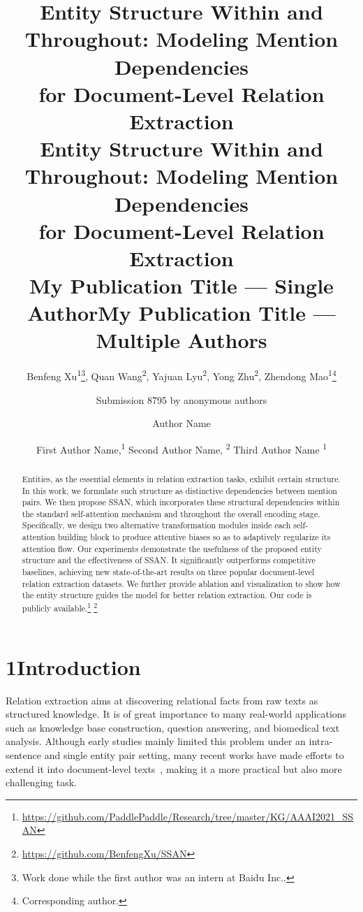 \documentclass[letterpaper]{article} \usepackage{aaai21}  \usepackage{times}  \usepackage{helvet} \usepackage{courier}  \usepackage[hyphens]{url}  \usepackage{graphicx} \usepackage{booktabs}
\title{Entity Structure Within and Throughout: Modeling Mention Dependencies\\
 for Document-Level Relation Extraction\\}
\author {
Benfeng Xu\textsuperscript{\rm 1}\thanks{Work done while the first author was an intern at Baidu Inc..},
        Quan Wang\textsuperscript{\rm 2},
        Yajuan Lyu\textsuperscript{\rm 2},
        Yong Zhu\textsuperscript{\rm 2},
        Zhendong Mao\textsuperscript{\rm 1}\thanks{Corresponding author.} \\
}
\title{Entity Structure Within and Throughout: Modeling Mention Dependencies\\
 for Document-Level Relation Extraction\\
}
\author{
Submission 8795 by anonymous authors
    }
\title{My Publication Title --- Single Author}
\author {
Author Name \\
}
\title{My Publication Title --- Multiple Authors}
\author {


        First Author Name,\textsuperscript{\rm 1}
        Second Author Name, \textsuperscript{\rm 2}
        Third Author Name \textsuperscript{\rm 1} \\
}
\begin{document}
\maketitle

\begin{abstract}
Entities, as the essential elements in relation extraction tasks, exhibit certain structure.
In this work, we formulate such structure as distinctive dependencies between mention pairs.
We then propose SSAN, which incorporates these structural dependencies within the standard self-attention mechanism and throughout the overall encoding stage.
Specifically, we design two alternative transformation modules inside each self-attention building block to produce attentive biases so as to adaptively regularize its attention flow.
Our experiments demonstrate the usefulness of the proposed entity structure and the effectiveness of SSAN.
It significantly outperforms competitive baselines, achieving new state-of-the-art results on three popular document-level relation extraction datasets.
We further provide ablation and visualization to show how the entity structure guides the model for better relation extraction. Our code is publicly available.\footnote{\url{https://github.com/PaddlePaddle/Research/tree/master/KG/AAAI2021_SSAN}}
\footnote{\url{https://github.com/BenfengXu/SSAN}}
\end{abstract}


\section{1\quad Introduction}
Relation extraction aims at discovering relational facts from raw texts as structured knowledge.
It is of great importance to many real-world applications such as knowledge base construction, question answering, and biomedical text analysis.
Although early studies mainly limited this problem under an intra-sentence and single entity pair setting, many recent works have made efforts to extend it into document-level texts~\cite{li2016biocreative,yao-etal-2019-docred}, making it a more practical but also more challenging task.
\end{document}
